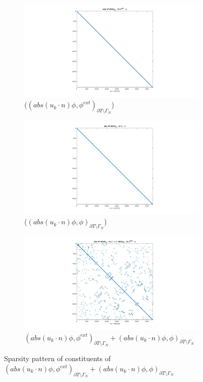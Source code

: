 \documentclass[a4paper,openany]{book}
\begin{document}
\begin{figure}[H]
\begin{subfigure}{\textwidth}
\centering
  \includegraphics[width=\linewidth]{figure91.jpg}
  \caption{($(abs(u_k \cdot n)\phi,\phi^{ext})_{\partial T \setminus \Gamma_N}$)}
  \label{figure_91}
\end{subfigure}
\begin{subfigure}{\textwidth}	
\centering
  \includegraphics[width=\linewidth]{figure92.jpg}
  \caption{($(abs(u_k \cdot n)\phi,\phi)_{\partial T \setminus \Gamma_N}$)}
  \label{figure_92}
\end{subfigure}
\begin{subfigure}{\textwidth}	
\centering
  \includegraphics[width=\linewidth]{figure9.jpg}
  \caption{$(abs(u_k \cdot n)\phi,\phi^{ext})_{\partial T \setminus \Gamma_N} + (abs(u_k \cdot n)\phi,\phi)_{\partial T \setminus \Gamma_N}$}
  \label{figure_9}
\end{subfigure}
\caption{Sparsity pattern of constituents of $(abs(u_k \cdot n)\phi,\phi^{ext})_{\partial T \setminus \Gamma_N} + (abs(u_k \cdot n)\phi,\phi)_{\partial T \setminus \Gamma_N}$}
\label{figure_9_all}
\end{figure}
\end{document}
